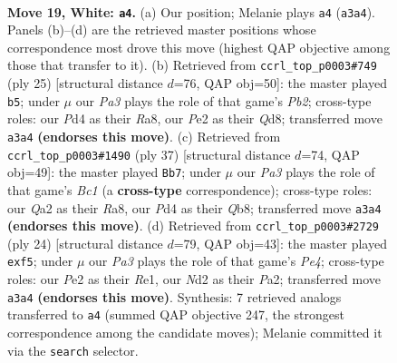 \documentclass[11pt]{article}
\begin{document}
\begin{figure}[p]
\label{fig:thought-m34}
\end{figure}

\clearpage

\begin{figure}[p]\centering
\begin{subfigure}{0.46\textwidth}\centering
\resizebox{\linewidth}{!}{%
\newchessgame
\chessboard[
  setfen={1rbq1r1k/p1n1b2p/1pp3p1/3p1p1n/3P1P2/PP3NP1/Q2NP1BP/R1B1R1K1 w - - 1 19},
  showmover=false,
  pgfstyle=straightmove, color=movearrow, markmove={a3-a4}
]}
\caption{}
\end{subfigure}\hfill
\begin{subfigure}{0.46\textwidth}\centering
\resizebox{\linewidth}{!}{%
\newchessgame
\chessboard[
  setfen={r1bqrbk1/pppn1pp1/5n1p/P3p3/1PN1P3/2PP1N2/4B1PP/R1BQ1RK1 b - - 2 13},
  showmover=false,
  pgfstyle=straightmove, color=movearrow, markmove={b7-b5}
]}
\caption{}
\end{subfigure}
\\[4pt]
\begin{subfigure}{0.46\textwidth}\centering
\resizebox{\linewidth}{!}{%
\newchessgame
\chessboard[
  setfen={rqbbr1k1/3n1ppp/5n2/p3p3/Np2P3/1P2BNPP/P1Q2P2/2R1RBK1 b - - 1 19},
  showmover=false,
  pgfstyle=straightmove, color=movearrow, markmove={c8-b7}
]}
\caption{}
\end{subfigure}\hfill
\begin{subfigure}{0.46\textwidth}\centering
\resizebox{\linewidth}{!}{%
\newchessgame
\chessboard[
  setfen={1rbq1r1k/p1p4p/2nppbp1/1p3p2/3PP2P/2PB1N2/PPQN1PP1/2K1R2R w - - 0 13},
  showmover=false,
  pgfstyle=straightmove, color=movearrow, markmove={e4-f5}
]}
\caption{}
\end{subfigure}
\caption{\textbf{Move 19, White: \texttt{a4}.} (a) Our position; Melanie plays \texttt{a4} (\texttt{a3a4}). Panels (b)--(d) are the retrieved master positions whose correspondence most drove this move (highest QAP objective among those that transfer to it). (b) Retrieved from \texttt{ccrl\_top\_p0003\#749} (ply 25) [structural distance $d$=76, QAP obj=50]: the master played \texttt{b5}; under $\mu$ our \emph{Pa3} plays the role of that game's \emph{Pb2}; cross-type roles: our \emph{P}d4 as their \emph{R}a8, our \emph{P}e2 as their \emph{Q}d8; transferred move \texttt{a3a4} \textbf{(endorses this move)}. (c) Retrieved from \texttt{ccrl\_top\_p0003\#1490} (ply 37) [structural distance $d$=74, QAP obj=49]: the master played \texttt{Bb7}; under $\mu$ our \emph{Pa3} plays the role of that game's \emph{Bc1} (a \textbf{cross-type} correspondence); cross-type roles: our \emph{Q}a2 as their \emph{R}a8, our \emph{P}d4 as their \emph{Q}b8; transferred move \texttt{a3a4} \textbf{(endorses this move)}. (d) Retrieved from \texttt{ccrl\_top\_p0003\#2729} (ply 24) [structural distance $d$=79, QAP obj=43]: the master played \texttt{exf5}; under $\mu$ our \emph{Pa3} plays the role of that game's \emph{Pe4}; cross-type roles: our \emph{P}e2 as their \emph{R}e1, our \emph{N}d2 as their \emph{P}a2; transferred move \texttt{a3a4} \textbf{(endorses this move)}. Synthesis: 7 retrieved analogs transferred to \texttt{a4} (summed QAP objective 247, the strongest correspondence among the candidate moves); Melanie committed it via the \texttt{search} selector.}

\end{figure}
\end{document}
